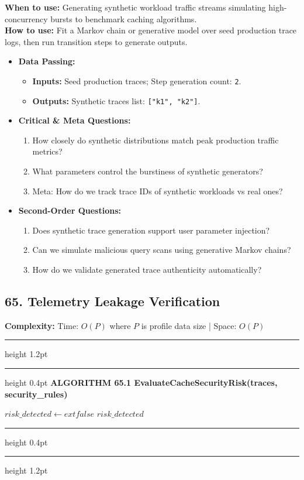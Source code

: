 \documentclass[11pt,a4paper]{article}
\newenvironment{textbookalgo}[2]{%
  \par\addvspace{1.2em}\noindent
  \hrule height 1.2pt
  \vspace{1.5pt}
  \hrule height 0.4pt
  \vspace{5pt}
  {\noindent\large\bfseries\sffamily ALGORITHM #1 \quad #2}
  \par\vspace{5pt}
  \RestyleAlgo{plain}
}{%
  \par\vspace{4pt}
  \hrule height 0.4pt
  \vspace{1.5pt}
  \hrule height 1.2pt
  \par\addvspace{1.2em}
}
\theoremstyle{definition}
\begin{document}
\noindent
\textbf{When to use:} Generating synthetic workload traffic streams simulating high-concurrency bursts to benchmark caching algorithms.\\
\textbf{How to use:} Fit a Markov chain or generative model over seed production trace logs, then run transition steps to generate outputs.
\begin{itemize}[leftmargin=*]
  \item[] \textbf{Data Passing:}
    \begin{itemize}
      \item \textbf{Inputs:} Seed production traces; Step generation count: \texttt{2}.
      \item \textbf{Outputs:} Synthetic traces list: \texttt{["k1", "k2"]}.
    \end{itemize}
  \item[] \textbf{Critical \& Meta Questions:}
  \begin{enumerate}
    \item How closely do synthetic distributions match peak production traffic metrics?
    \item What parameters control the burstiness of synthetic generators?
    \item Meta: How do we track trace IDs of synthetic workloads vs real ones?
  \end{enumerate}
  \item[] \textbf{Second-Order Questions:}
  \begin{enumerate}
    \item Does synthetic trace generation support user parameter injection?
    \item Can we simulate malicious query scans using generative Markov chains?
    \item How do we validate generated trace authenticity automatically?
  \end{enumerate}
\end{itemize}
\medskip

\clearpage
\subsection{65. Telemetry Leakage Verification}


\noindent
\textbf{Complexity:} Time: $O(P)$ where $P$ is profile data size | Space: $O(P)$
\smallskip

\begin{textbookalgo}{65.1}{EvaluateCacheSecurityRisk(traces, security\_rules)}
\begin{algorithm}[H]
$risk\_detected \leftarrow 	ext{false}$\;
\Return $risk\_detected$\;
\end{algorithm}
\end{textbookalgo}
\end{document}
